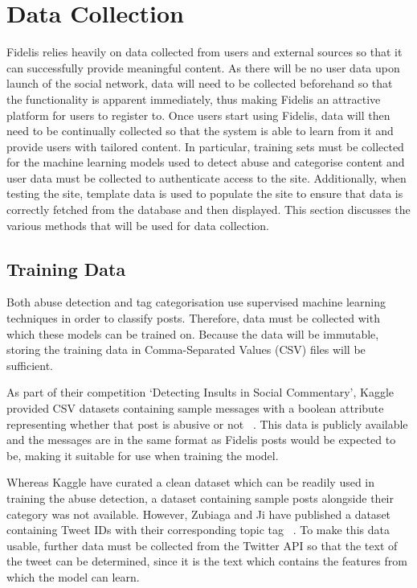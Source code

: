 \section{Data Collection}
Fidelis relies heavily on data collected from users and external sources so that it can successfully provide meaningful content. As there will be no user data upon launch of the social network, data will need to be collected beforehand so that the functionality is apparent immediately, thus making Fidelis an attractive platform for users to register to. Once users start using Fidelis, data will then need to be continually collected so that the system is able to learn from it and provide users with tailored content. In particular, training sets must be collected for the machine learning models used to detect abuse and categorise content and user data must be collected to authenticate access to the site. Additionally, when testing the site, template data is used to populate the site to ensure that data is correctly fetched from the database and then displayed. This section discusses the various methods that will be used for data collection.

\subsection{Training Data}
Both abuse detection and tag categorisation use supervised machine learning techniques in order to classify posts.  Therefore, data must be collected with which these models can be trained on. Because the data will be immutable, storing the training data in Comma-Separated Values (CSV) files will be sufficient.

As part of their competition `Detecting Insults in Social Commentary', Kaggle provided CSV datasets containing sample messages with a boolean attribute representing whether that post is abusive or not ~\cite{Kaggle:Dataset}. This data is publicly available and the messages are in the same format as Fidelis posts would be expected to be, making it suitable for use when training the model.

Whereas Kaggle have curated a clean dataset which can be readily used in training the abuse detection, a dataset containing sample posts alongside their category was not available. However, Zubiaga and Ji have published a dataset containing Tweet IDs with their corresponding topic tag ~\cite{Zubiaga:Tweets}. To make this data usable, further data must be collected from the Twitter API so that the text of the tweet can be determined, since it is the text which contains the features from which the model can learn.

